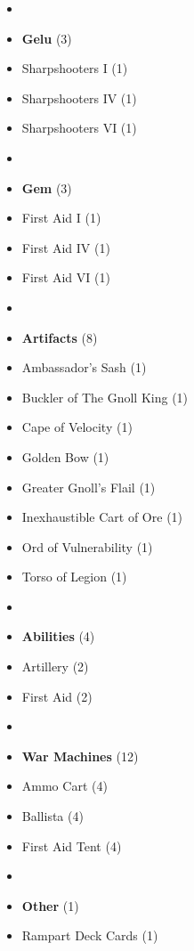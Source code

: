 \begin{multicols*}{3}
\begin{itemize}[leftmargin=0pt, label={}, noitemsep]
  \item
  \item \textbf{Gelu} (3)
  \item Sharpshooters I (1)
  \item Sharpshooters IV (1)
  \item Sharpshooters VI (1)
  \item
  \item \textbf{Gem} (3)
  \item First Aid I (1)
  \item First Aid IV (1)
  \item First Aid VI (1)
  \item
  \item \textbf{Artifacts} (8)
  \item Ambassador's Sash (1)
  \item Buckler of The Gnoll King (1)
  \item Cape of Velocity (1)
  \item Golden Bow (1)
  \item Greater Gnoll's Flail (1)
  \item Inexhaustible Cart of Ore (1)
  \item Ord of Vulnerability (1)
  \item Torso of Legion (1)
  \item
  \item \textbf{Abilities} (4)
  \item Artillery (2)
  \item First Aid (2)
  \item
  \item \textbf{War Machines} (12)
  \item Ammo Cart (4)
  \item Ballista (4)
  \item First Aid Tent (4)
  \item
  \item \textbf{Other} (1)
  \item Rampart Deck Cards (1)
\end{itemize}

\end{multicols*}
